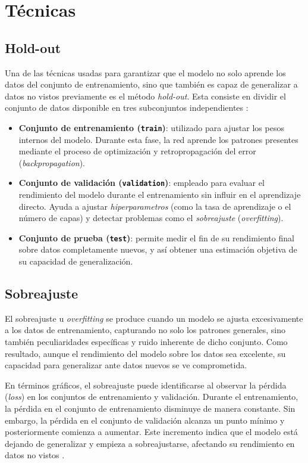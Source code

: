\section{Técnicas}
\subsection{Hold-out}
Una de las técnicas usadas para garantizar que el modelo no solo aprende los datos del conjunto de entrenamiento, sino que también es capaz de generalizar a datos no vistos previamente es el método \textit{hold-out}. Esta consiste en dividir el conjunto de datos disponible en tres subconjuntos independientes \cite{deeplearning2016}:
\begin{itemize}
    \item \textbf{Conjunto de entrenamiento (\texttt{train})}: utilizado para ajustar los pesos internos del modelo. Durante esta fase, la red aprende los patrones presentes mediante el proceso de optimización y retropropagación del error (\textit{backpropagation}).
    \item \textbf{Conjunto de validación (\texttt{validation})}: empleado para evaluar el rendimiento del modelo durante el entrenamiento sin influir en el aprendizaje directo. Ayuda a ajustar \textit{hiperparametros} (como la tasa de aprendizaje o el número de capas) y detectar problemas como el \textit{sobreajuste} (\textit{overfitting}).
    \item \textbf{Conjunto de prueba (\texttt{test})}: permite medir el fin de su rendimiento final sobre datos completamente nuevos, y así obtener una estimación objetiva de su capacidad de generalización. 
\end{itemize}

\subsection{Sobreajuste}
El sobreajuste u \textit{overfitting} se produce cuando un modelo se ajusta excesivamente a los datos de entrenamiento, capturando no solo los patrones generales, sino también peculiaridades específicas y ruido inherente de dicho conjunto. Como resultado, aunque el rendimiento del modelo sobre los datos sea excelente, su capacidad para generalizar ante datos nuevos se ve comprometida. 

En términos gráficos, el sobreajuste puede identificarse al observar la pérdida (\textit{loss}) en los conjuntos de entrenamiento y validación. Durante el entrenamiento, la pérdida en el conjunto de entrenamiento disminuye de manera constante. Sin embargo, la pérdida en el conjunto de validación alcanza un punto mínimo y posteriormente comienza a aumentar. Este incremento indica que el modelo está dejando de generalizar y empieza a sobreajustarse, afectando su rendimiento en datos no vistos \cite{ying2019overfitting}.
